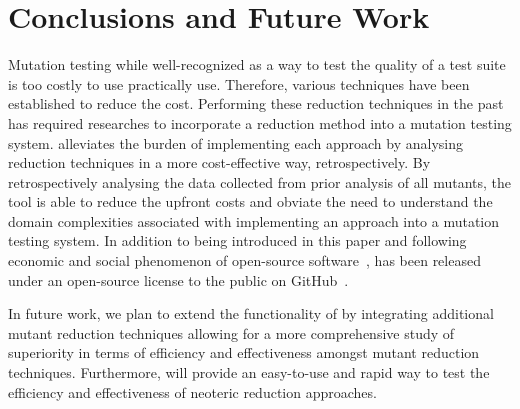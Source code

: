 \section{Conclusions and Future Work}

Mutation testing while well-recognized as a way to test the quality of a test suite is too costly
to use practically use. Therefore, various techniques have been established to reduce the cost.
Performing these reduction techniques in the past has required researches
to incorporate a reduction method into a mutation testing system. \mr alleviates the burden of implementing
each approach by analysing reduction techniques in a more cost-effective way, retrospectively.
By retrospectively analysing the data collected from prior analysis of all mutants, the \mr tool is able to reduce
the upfront costs and obviate the need to understand the domain complexities associated with implementing an approach
into a mutation testing system. In addition to
being introduced in this paper and following economic and social phenomenon of open-source software~\cite{hippel2003open}, \mr
has been released under an open-source license to the public on GitHub~\cite{github}.

In future work, we plan to extend the functionality of \mr by integrating additional
mutant reduction techniques allowing
for a more comprehensive study of superiority in terms of efficiency and effectiveness amongst
mutant reduction techniques. Furthermore, \mr will provide an easy-to-use and rapid
way to test the efficiency and effectiveness of neoteric reduction approaches.

